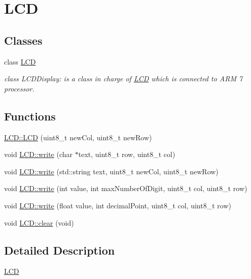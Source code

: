 \hypertarget{group__group4}{
\section{LCD}
\label{group__group4}
}
\subsection*{Classes}
\begin{DoxyCompactItemize}
\item 
class \hyperlink{class_l_c_d}{LCD}
\begin{DoxyCompactList}\small\item\em class LCDDisplay: is a class in charge of \hyperlink{class_l_c_d}{LCD} which is connected to ARM 7 processor. \end{DoxyCompactList}\end{DoxyCompactItemize}
\subsection*{Functions}
\begin{DoxyCompactItemize}
\item 
\hyperlink{group__group4_gad7b32b8bdd06c2c869e3921a0e080463}{LCD::LCD} (uint8\_\-t newCol, uint8\_\-t newRow)
\item 
void \hyperlink{group__group4_ga94fccf508202dc5054e8f990926b9b70}{LCD::write} (char $\ast$text, uint8\_\-t row, uint8\_\-t col)
\item 
void \hyperlink{group__group4_gacd10a19161e4016bb70b9556928e2200}{LCD::write} (std::string text, uint8\_\-t newCol, uint8\_\-t newRow)
\item 
void \hyperlink{group__group4_ga8b72d022aa4a61e46118f40b428bbd3c}{LCD::write} (int value, int maxNumberOfDigit, uint8\_\-t col, uint8\_\-t row)
\item 
void \hyperlink{group__group4_ga8ed890a03ddaf7c5ba3ddaa569fb83ad}{LCD::write} (float value, int decimalPoint, uint8\_\-t col, uint8\_\-t row)
\item 
void \hyperlink{group__group4_gaca6cd9e401283d5fa4917d53260b3ba9}{LCD::clear} (void)
\end{DoxyCompactItemize}


\subsection{Detailed Description}
\hyperlink{class_l_c_d}{LCD} 

